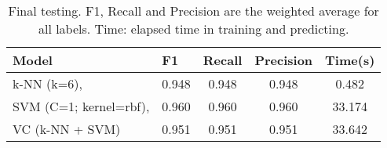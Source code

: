\begin{table}
\centering
\caption{Final testing. F1, Recall and Precision are the weighted average for all labels. Time: elapsed time in training and predicting. }
\label{tab:test}
\begin{tabular}{|l|l|c|c|c|}
\toprule
                                Model &    F1 &  Recall &  Precision &   Time(s) \\
\midrule
                    k-NN (k=6),  & 0.948 &   0.948 &      0.948 &  0.482 \\
        SVM (C=1; kernel=rbf),  & 0.960 &   0.960 &      0.960 & 33.174 \\
VC (k-NN + SVM) & 0.951 &   0.951 &      0.951 & 33.642 \\
\bottomrule
\end{tabular}
\end{table}
